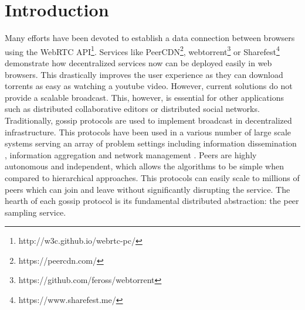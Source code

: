 \documentclass[11pt, english, screen]{report-rd-info}
\begin{document}
\maketitle




\newpage

\tableofcontents




\chapter{Introduction}

Many efforts have been devoted to establish a data connection between browsers using the WebRTC API\footnote{http://w3c.github.io/webrtc-pc/}. 
Services like PeerCDN\footnote{https://peercdn.com/}, webtorrent\footnote{https://github.com/feross/webtorrent} or Sharefest\footnote{https://www.sharefest.me/} demonstrate how decentralized services now can be deployed easily in web browsers.
This drastically improves the user experience as they can download torrents as easy as watching a youtube video.
However, current solutions do not provide a scalable broadcast.
This, however, is essential for other applications such as distributed collaborative editors or distributed social networks.
Traditionally, gossip protocols are used to implement broadcast in decentralized infrastructure.
This protocols have been used in a various number of large scale systems serving an array of problem settings including information dissemination \cite{Demers:1987:EAR:41840.41841}, information aggregation \cite{Jelasity:2005:GAL:1082469.1082470} and network management \cite{conf/dsom/VoulgarisS03}.
Peers are highly autonomous and independent, which allows the algorithms to be simple when compared to hierarchical approaches.
This protocols can easily scale to millions of peers which can join and leave without significantly disrupting the service.
The hearth of each gossip protocol is its fundamental distributed abstraction: the peer sampling service\cite{Jelasity:2004:PSS:1045658.1045666}.
\end{document}

